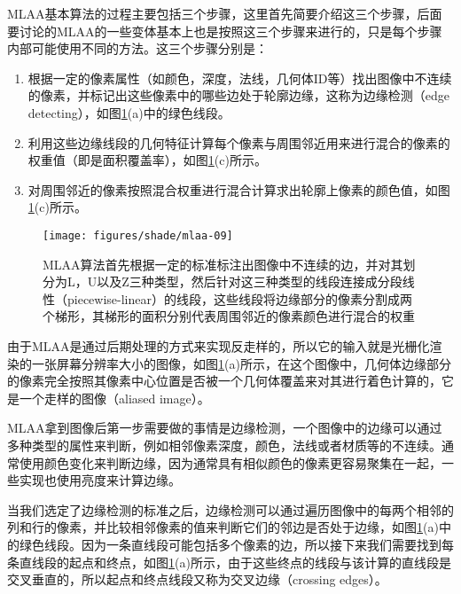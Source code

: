 MLAA基本算法的过程主要包括三个步骤，这里首先简要介绍这三个步骤，后面要讨论的MLAA的一些变体基本上也是按照这三个步骤来进行的，只是每个步骤内部可能使用不同的方法。这三个步骤分别是：

\begin{enumerate}
	\item 根据一定的像素属性（如颜色，深度，法线，几何体ID等）找出图像中不连续的像素，并标记出这些像素中的哪些边处于轮廓边缘，这称为边缘检测（edge detecting），如图\ref{f:shade-mlaa}(a)中的绿色线段。
	\item 利用这些边缘线段的几何特征计算每个像素与周围邻近用来进行混合的像素的权重值（即是面积覆盖率），如图\ref{f:shade-mlaa}(c)所示。
	\item 对周围邻近的像素按照混合权重进行混合计算求出轮廓上像素的颜色值，如图\ref{f:shade-mlaa}(c)所示。
\end{enumerate}

\begin{figure}
\begin{fullwidth}
	\texttt{[image: figures/shade/mlaa-09]}
	\caption{MLAA算法首先根据一定的标准标注出图像中不连续的边，并对其划分为L，U以及Z三种类型，然后针对这三种类型的线段连接成分段线性（piecewise-linear）的线段，这些线段将边缘部分的像素分割成两个梯形，其梯形的面积分别代表周围邻近的像素颜色进行混合的权重}
	\label{f:shade-mlaa}
\end{fullwidth}
\end{figure}

由于MLAA是通过后期处理的方式来实现反走样的，所以它的输入就是光栅化渲染的一张屏幕分辨率大小的图像，如图\ref{f:shade-mlaa}(a)所示，在这个图像中，几何体边缘部分的像素完全按照其像素中心位置是否被一个几何体覆盖来对其进行着色计算的，它是一个走样的图像（aliased image）。

MLAA拿到图像后第一步需要做的事情是边缘检测，一个图像中的边缘可以通过多种类型的属性来判断，例如相邻像素深度，颜色，法线或者材质等的不连续。通常使用颜色变化来判断边缘，因为通常具有相似颜色的像素更容易聚集在一起，一些实现也使用亮度来计算边缘。

当我们选定了边缘检测的标准之后，边缘检测可以通过遍历图像中的每两个相邻的列和行的像素，并比较相邻像素的值来判断它们的邻边是否处于边缘，如图\ref{f:shade-mlaa}(a)中的绿色线段。因为一条直线段可能包括多个像素的边，所以接下来我们需要找到每条直线段的起点和终点，如图\ref{f:shade-mlaa}(a)所示，由于这些终点的线段与该计算的直线段是交叉垂直的，所以起点和终点线段又称为交叉边缘（crossing edges）。

